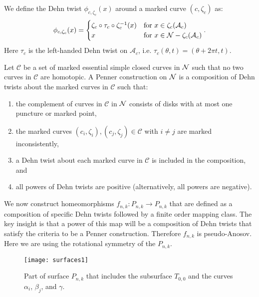  We define the Dehn twist $\phi_{c,\zeta_c}(x)$ around a marked curve $(c,\zeta_c)$ as:
\begin{align*}
  \phi_{c,\zeta_c}(x) =
  \begin{cases}
    \zeta_c \circ \tau_c \circ \zeta_c^{-1}(x) & \text{for } x \in \zeta_c(\mathcal{A}_c) \\
    x & \text{for } x \in \mathcal{N} - \zeta_c(\mathcal{A}_c)
  \end{cases}.
\end{align*}
Here $\tau_c$ is the left-handed Dehn twist on $\mathcal{A}_c$, i.e. $\tau_c(\theta,t) = (\theta + 2\pi t,t)$.

 Let $\mathcal{C}$ be a set of marked essential simple closed curves in $\mathcal{N}$ such that no two curves in $\mathcal{C}$ are homotopic.  A Penner construction on $\mathcal{N}$ is a composition of Dehn twists about the marked curves in $\mathcal{C}$ such that:
\begin{enumerate}
\item the complement of curves in $\mathcal{C}$ in $\mathcal{N}$ consists of disks with at most one puncture or marked point,
    \item the marked curves $(c_i,\zeta_i),(c_j,\zeta_j)\in\mathcal{C}$ with $i\neq j$ are marked inconsistently,
    \item a Dehn twist about each marked curve in $\mathcal{C}$ is included in the composition, and
    \item all powers of Dehn twists are positive (alternatively, all powers are negative).
\end{enumerate}



 We now construct homeomorphisms $f_{n,k}: P_{n,k} \to P_{n,k}$ that are defined as a composition of specific Dehn twists
followed by a finite order mapping class. The key insight is that a power of this map will be a composition of
Dehn twists that satisfy the criteria to be a Penner construction.  Therefore $f_{n,k}$ is pseudo-Anosov. Here we are using the rotational symmetry of the $P_{n,k}$.

\begin{figure}[t]
    \centering
    \texttt{[image: surfaces1]}
    \caption{Part of surface $P_{n,k}$ that includes the subsurface $T_{0,0}$ and the curves $\alpha_i$, $\beta_j$, and $\gamma$.}
    \label{fig:curves}
\end{figure}



